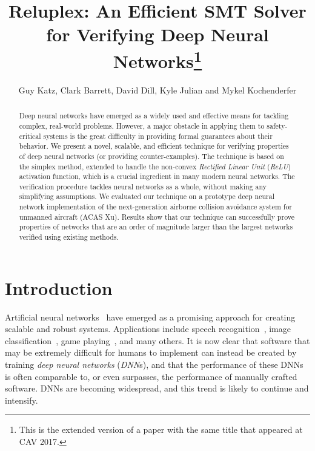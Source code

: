 \documentclass[a4paper]{llncs}
\begin{document}
\title{Reluplex: An Efficient SMT Solver for Verifying 
Deep Neural Networks\thanks{This is the extended version of a paper
  with the same title that appeared at CAV 2017.}}
 
\author{Guy Katz, Clark Barrett, David Dill, Kyle Julian and Mykel Kochenderfer}

\maketitle


\begin{abstract}
Deep neural networks have emerged as a widely used and effective means for
tackling complex, real-world problems. However, a major obstacle in applying them to
safety-critical systems is the great difficulty in providing
formal guarantees about their behavior.
We present a novel, scalable, and efficient technique for verifying 
properties of deep neural networks (or providing counter-examples). The
technique is based on the simplex method, extended to handle
the non-convex \emph{Rectified Linear Unit} (\emph{ReLU})
activation function, which is a crucial ingredient in many modern neural networks.
The verification procedure tackles neural networks as a whole,
without making any simplifying assumptions.
We evaluated our technique on a prototype deep neural
network implementation of the next-generation airborne collision
avoidance system for unmanned aircraft
(ACAS Xu). Results show that our technique can
successfully prove properties of networks that are an order of magnitude larger
than the largest networks verified using existing methods.
\end{abstract}

\section{Introduction}
Artificial neural networks~\cite{RiTo99,FoBeCu16}
have emerged as a
promising approach for creating scalable and robust systems.
Applications include speech
recognition~\cite{HiDeYuDaMoJaSeVaNgSaKi12}, image
classification~\cite{KrSuHi12}, game
playing~\cite{SiHuMaGuSiVaScAnPaLaDi16}, and many others.
It is now clear that software that may be extremely
difficult for humans to implement can instead be created by
training \emph{deep neural networks} (\emph{DNN}s), and that the
performance of these DNNs is often comparable to, or even surpasses, the
performance of manually crafted software. 
DNNs are becoming widespread, and this trend is likely to continue and intensify. 
\end{document}
